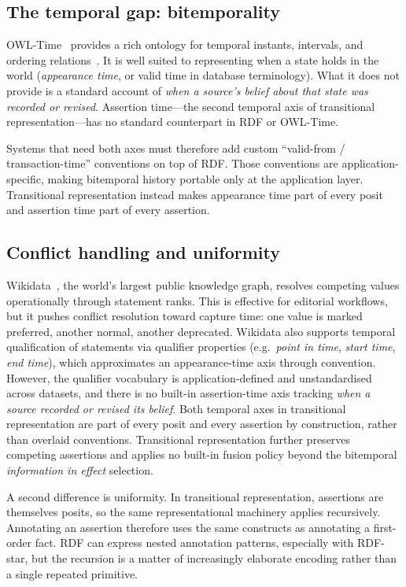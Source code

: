 \documentclass[a4paper,fleqn]{cas-sc}
\begin{document}
\subsection{The temporal gap: bitemporality}
OWL-Time~\cite{OWLTime} provides a rich ontology for temporal instants, intervals, and ordering relations~\cite{Allen}. It is well suited to representing when a state holds in the world (\emph{appearance time}, or valid time in database terminology). What it does not provide is a standard account of \emph{when a source's belief about that state was recorded or revised}. Assertion time---the second temporal axis of transitional representation---has no standard counterpart in RDF or OWL-Time.

Systems that need both axes must therefore add custom ``valid-from / transaction-time'' conventions on top of RDF. Those conventions are application-specific, making bitemporal history portable only at the application layer. Transitional representation instead makes appearance time part of every posit and assertion time part of every assertion.

\subsection{Conflict handling and uniformity}
Wikidata~\cite{VrandecicKrotzsch}, the world's largest public knowledge graph, resolves competing values operationally through statement ranks. This is effective for editorial workflows, but it pushes conflict resolution toward capture time: one value is marked preferred, another normal, another deprecated. Wikidata also supports temporal qualification of statements via qualifier properties (e.g.\ \textit{point in time}, \textit{start time}, \textit{end time}), which approximates an appearance-time axis through convention. However, the qualifier vocabulary is application-defined and unstandardised across datasets, and there is no built-in assertion-time axis tracking \emph{when a source recorded or revised its belief}. Both temporal axes in transitional representation are part of every posit and every assertion by construction, rather than overlaid conventions. Transitional representation further preserves competing assertions and applies no built-in fusion policy beyond the bitemporal \emph{information in effect} selection.

A second difference is uniformity. In transitional representation, assertions are themselves posits, so the same representational machinery applies recursively. Annotating an assertion therefore uses the same constructs as annotating a first-order fact. RDF can express nested annotation patterns, especially with RDF-star, but the recursion is a matter of increasingly elaborate encoding rather than a single repeated primitive.
\end{document}
